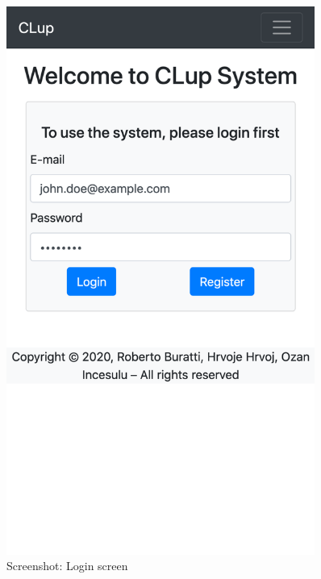 \begin{figure}[H]
    \centering
    \begin{minipage}{0.45\textwidth}
        \centering
        \includegraphics[width=0.9\textwidth]{Images/Screenshots/login.png}
        \caption{Screenshot: Login screen}
    \end{minipage}\hfill
    \begin{minipage}{0.45\textwidth}
        \centering

\end{minipage}
\end{figure}

